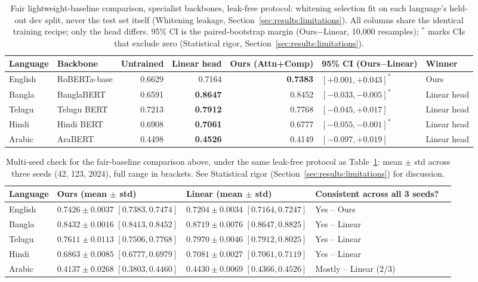 \documentclass[manuscript]{acmart}
\begin{document}
\begin{table}[h]
\caption{Fair lightweight-baseline comparison, specialist backbones, leak-free protocol: whitening selection fit on each language's held-out dev split, never the test set itself (Whitening leakage, Section~\ref{sec:results:limitations}). All columns share the identical training recipe; only the head differs. 95\% CI is the paired-bootstrap margin (Ours$-$Linear, 10,000 resamples); $^{*}$ marks CIs that exclude zero (Statistical rigor, Section~\ref{sec:results:limitations}).}
\label{tab:baseline-head}
\begin{tabular}{@{}llrrrll@{}}
\toprule
Language & Backbone & Untrained & Linear head & Ours (Attn+Comp) & 95\% CI (Ours$-$Linear) & Winner \\
\midrule
English & RoBERTa-base & 0.6629 & 0.7164 & \textbf{0.7383} & $[+0.001,+0.043]^{*}$ & Ours \\
Bangla  & BanglaBERT   & 0.6591 & \textbf{0.8647} & 0.8452 & $[-0.033,-0.005]^{*}$ & Linear head \\
Telugu  & Telugu BERT  & 0.7213 & \textbf{0.7912} & 0.7768 & $[-0.045,+0.017]$ & Linear head \\
Hindi   & Hindi BERT   & 0.6908 & \textbf{0.7061} & 0.6777 & $[-0.055,-0.001]^{*}$ & Linear head \\
Arabic  & AraBERT      & 0.4498 & \textbf{0.4526} & 0.4149 & $[-0.097,+0.019]$ & Linear head \\
\bottomrule
\end{tabular}
\end{table}

\begin{table}[h]
\caption{Multi-seed check for the fair-baseline comparison above, under the same leak-free protocol as Table~\ref{tab:baseline-head}: mean $\pm$ std across three seeds (42, 123, 2024), full range in brackets. See Statistical rigor (Section~\ref{sec:results:limitations}) for discussion.}
\label{tab:multiseed-fair-baseline}
\begin{tabular}{@{}lllll@{}}
\toprule
Language & Ours (mean $\pm$ std) & Linear (mean $\pm$ std) & Consistent across all 3 seeds? \\
\midrule
English & $0.7426 \pm 0.0037$ \small{$[0.7383,0.7474]$} & $0.7204 \pm 0.0034$ \small{$[0.7164,0.7247]$} & Yes -- Ours \\
Bangla  & $0.8432 \pm 0.0016$ \small{$[0.8413,0.8452]$} & $0.8719 \pm 0.0076$ \small{$[0.8647,0.8825]$} & Yes -- Linear \\
Telugu  & $0.7611 \pm 0.0113$ \small{$[0.7506,0.7768]$} & $0.7970 \pm 0.0046$ \small{$[0.7912,0.8025]$} & Yes -- Linear \\
Hindi   & $0.6863 \pm 0.0085$ \small{$[0.6777,0.6979]$} & $0.7081 \pm 0.0027$ \small{$[0.7061,0.7119]$} & Yes -- Linear \\
Arabic  & $0.4137 \pm 0.0268$ \small{$[0.3803,0.4460]$} & $0.4430 \pm 0.0069$ \small{$[0.4366,0.4526]$} & Mostly -- Linear (2/3) \\
\bottomrule
\end{tabular}
\end{table}
\end{document}
